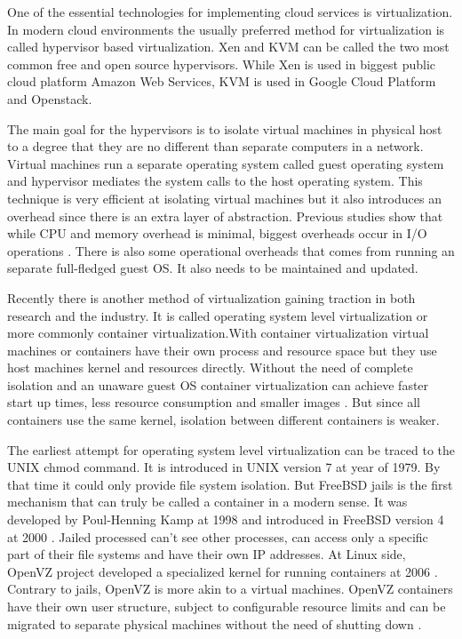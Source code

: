 \documentclass[12pt,oneandhalf,chaparabic,ceng,ms,eng,oneside,pntc]{gsufbe}
\begin{document}
One of the essential technologies for implementing cloud services is virtualization.  In modern cloud
environments the usually preferred method for virtualization is called hypervisor based virtualization.
Xen and KVM can be called the two most common free and open source hypervisors.  While Xen is used in
biggest public cloud platform Amazon Web Services, KVM is used in Google Cloud Platform and Openstack.

The main goal for the hypervisors is to isolate virtual machines in physical host to a degree that they
are no different than separate computers in a network.  Virtual machines run a separate operating system
called guest operating system and hypervisor mediates the system calls to the host operating system.
This technique is very efficient at isolating virtual machines but it also introduces an overhead
since there is an extra layer of abstraction.  Previous studies show that while CPU and memory overhead
is minimal, biggest overheads occur in I/O operations \cite{hwang_component_based_2013}.  There is also
some operational overheads that
comes from running an separate full-fledged guest OS.  It also needs to be maintained and updated.

Recently there is another method of virtualization gaining traction in both research and the industry.
It is called operating system level virtualization or more commonly container virtualization.With
container virtualization virtual machines or containers have their own process and resource space but
they use host machines kernel and resources directly.  Without the need of complete isolation and an
unaware guest OS container virtualization can achieve faster start up times, less resource consumption
and smaller images \cite{joy_performance_2015}.  But since all containers use the same kernel, isolation
between different containers is weaker.

The earliest attempt for operating system level virtualization can be traced to the UNIX chmod command.
It is introduced in UNIX version 7 at year of 1979.  By that time it could only provide file system
isolation.  But FreeBSD jails is the first mechanism that can truly be called a container in a modern
sense.  It was developed by Poul-Henning Kamp at 1998 and introduced in FreeBSD version 4 at 2000 
\cite{kamp_jails_2000}.
Jailed processed can't see other processes, can access only a specific part of their file systems and
have their own IP addresses.  At Linux side, OpenVZ project developed a specialized kernel for running
containers at 2006 \cite{kolyshkin_virtualization_2006}.  Contrary to jails, OpenVZ is more akin to a
virtual machines.  OpenVZ containers
have their own user structure, subject to configurable resource limits and can be migrated to separate
physical machines without the need of shutting down \cite{bernstein_containers_2014}.
\end{document}
